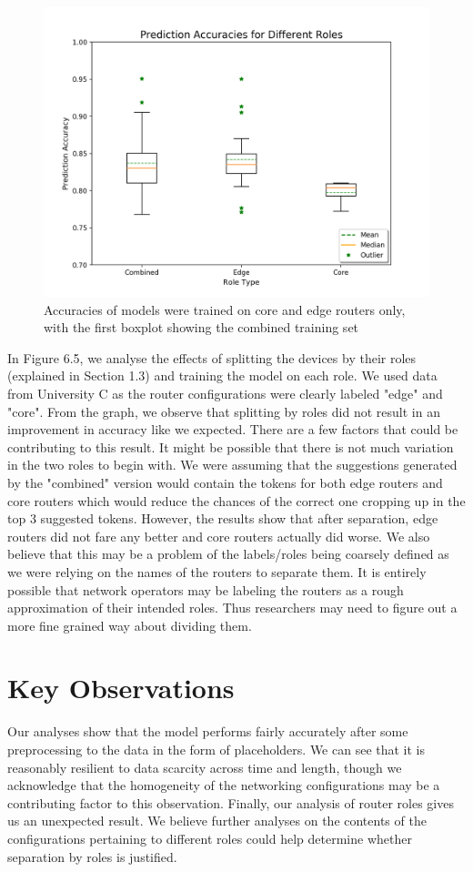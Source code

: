 \documentclass[../thesis.tex]{subfiles}
\begin{document}
\begin{figure}[H]
	\centering
	\includegraphics[width=\textwidth]{roles.png}
	\caption{Accuracies of models were trained on core and edge routers only, with the first boxplot showing the combined training set}
\end{figure}
In Figure 6.5, we analyse the effects of splitting the devices by their roles (explained in Section 1.3) and training the model on each role. We used data from University C as the router configurations were clearly labeled "edge" and "core". From the graph, we observe that splitting by roles did not result in an improvement in accuracy like we expected. There are a few factors that could be contributing to this result. It might be possible that there is not much variation in the two roles to begin with. We were assuming that the suggestions generated by the "combined" version would contain the tokens for both edge routers and core routers which would reduce the chances of the correct one cropping up in the top 3 suggested tokens. However, the results show that after separation, edge routers did not fare any better and core routers actually did worse. We also believe that this may be a problem of the labels/roles being coarsely defined as we were relying on the names of the routers to separate them. It is entirely possible that network operators may be labeling the routers as a rough approximation of their intended roles. Thus researchers may need to figure out a more fine grained way about dividing them.\\

\section{Key Observations}
Our analyses show that the model performs fairly accurately after some preprocessing to the data in the form of placeholders. We can see that it is reasonably resilient to data scarcity across time and length, though we acknowledge that the homogeneity of the networking configurations may be a contributing factor to this observation. Finally, our analysis of router roles gives us an unexpected result. We believe further analyses on the contents of the configurations pertaining to different roles could help determine whether separation by roles is justified.
\end{document}

